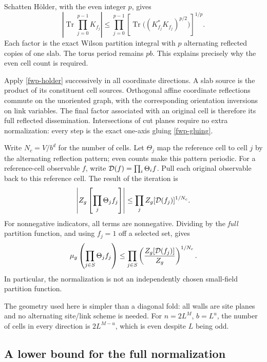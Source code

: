 Schatten H\"older, with the even integer \(p\), gives
\begin{equation}
 \left|\operatorname{Tr}\prod_{j=0}^{p-1}K_{f_j}\right|
 \le\prod_{j=0}^{p-1}
 \left[\operatorname{Tr}\bigl((K_{f_j}^*K_{f_j})^{p/2}\bigr)
                                                  \right]^{1/p}.
 \label{fwp-holder}
\end{equation}
Each factor is the exact Wilson partition integral with \(p\) alternating
reflected copies of one slab. The torus period remains \(pb\).
This explains precisely why the even cell count is required.

Apply \eqref{fwp-holder} successively in all coordinate directions.
A slab source is the product of its constituent cell sources.
Orthogonal affine coordinate reflections commute on the unoriented
graph, with the corresponding orientation inversions on link variables.
The final factor associated with an original cell is therefore its
full reflected dissemination. Intersections of cut planes require no
extra normalization: every step is the exact one-axis gluing
\eqref{fwp-gluing}.

Write \(N_c=V/b^d\) for the number of cells. Let \(\Theta_j\) map the
reference cell to cell \(j\) by the alternating reflection pattern;
even counts make this pattern periodic. For a reference-cell observable
\(f\), write
\({\cal D}(f)=\prod_i\Theta_i f\).
Pull each original observable back to this reference cell.
The result of the iteration is
\begin{equation}
 \left|Z_g\left[\prod_j\Theta_j f_j\right]\right|
 \le\prod_j Z_g[{\cal D}(f_j)]^{1/N_c}.
 \label{fwp-chessboard}
\end{equation}
For nonnegative indicators, all terms are nonnegative. Dividing by the
\emph{full} partition function, and using \(f_j=1\) off a selected set,
gives
\begin{equation}
 \mu_g\left(\prod_{j\in S}\Theta_j f_j\right)
 \le\prod_{j\in S}
       \left(\frac{Z_g[{\cal D}(f_j)]}{Z_g}\right)^{1/N_c}.
 \label{fwp-normalized}
\end{equation}
In particular, the normalization is not an independently chosen
small-field partition function.

The geometry used here is simpler than a diagonal fold: all walls are
site planes and no alternating site/link scheme is needed.
For \(n=2L^M\), \(b=L^u\), the number of cells in every direction is
\(2L^{M-u}\), which is even despite \(L\) being odd.

\subsection{A lower bound for the full normalization}
\label{fwp-normalization-section}

